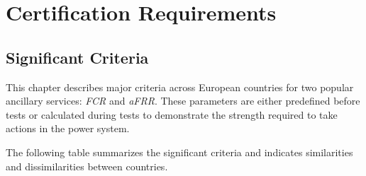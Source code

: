 \hypersetup{hidelinks}

\chapter{Certification Requirements}

\section{Significant Criteria}
This chapter describes major criteria across European countries for two popular ancillary services: \textit{FCR} and \textit{aFRR}. These parameters are either predefined before tests or calculated during tests to demonstrate the strength required to take actions in the power system.

The following table summarizes the significant criteria and indicates similarities and dissimilarities between countries.

